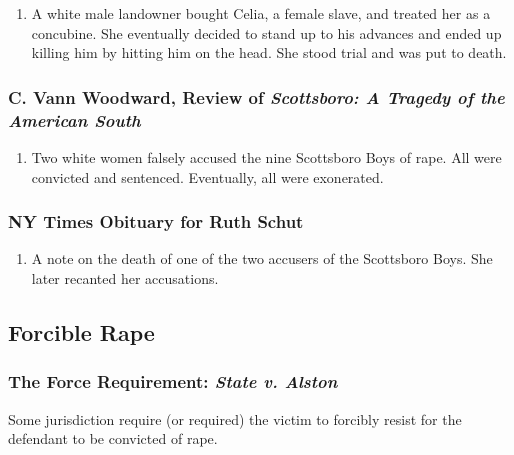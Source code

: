 \begin{enumerate}
    \item A white male landowner bought Celia, a female slave, and treated her 
    as a concubine. She eventually decided to stand up to his advances and 
    ended up killing him by hitting him on the head. She stood trial and was 
    put to death.
\end{enumerate}

\subsubsection{C. Vann Woodward, Review of \emph{Scottsboro: A Tragedy of the 
American South}}

\begin{enumerate}
    \item Two white women falsely accused the nine Scottsboro Boys of rape. 
    All were convicted and sentenced. Eventually, all were exonerated.
\end{enumerate}

\subsubsection{NY Times Obituary for Ruth Schut}

\begin{enumerate}
    \item A note on the death of one of the two accusers of the Scottsboro 
    Boys. She later recanted her accusations.
\end{enumerate}

\subsection{Forcible Rape}

\subsubsection{The Force Requirement: \emph{State v. Alston}}

Some jurisdiction require (or required) the victim to forcibly resist for the 
defendant to be convicted of rape.

